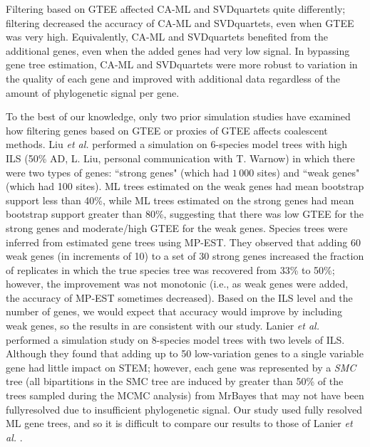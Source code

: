 Filtering based on GTEE affected CA-ML and SVDquartets quite differently; filtering decreased the accuracy of CA-ML and SVDquartets, even when GTEE was very high. 
Equivalently, CA-ML and SVDquartets benefited from the additional genes, even when the added genes had very low signal. 
In bypassing gene tree estimation, CA-ML and SVDquartets were more robust to variation in the quality of each gene and improved with additional data regardless of the amount of phylogenetic signal per gene.

To the best of our knowledge, only two prior simulation studies \cite{liu2015estimating, lanier2014how} have examined how filtering genes based on GTEE or proxies of GTEE affects coalescent methods.
Liu {\em et al.} \cite{liu2015estimating} performed a simulation on 6-species model trees with high ILS (50\% AD, L. Liu, personal communication with T. Warnow) in which there were two types of genes: ``strong genes" (which had $1\,000$ sites) and ``weak genes" (which had 100 sites). 
ML trees estimated on the weak genes had mean bootstrap support less than 40\%, while ML trees estimated on the strong genes had mean bootstrap support greater than 80\%, suggesting that there was low GTEE for the strong genes and moderate/high GTEE for the weak genes.
Species trees were inferred from estimated gene trees using MP-EST.
They \cite{liu2015estimating} observed that adding 60 weak genes (in increments of 10) to a set of 30 strong genes increased the fraction of replicates in which the true species tree was recovered from 33\% to 50\%; however, the improvement was not monotonic (i.e., as weak genes were added, the accuracy of MP-EST sometimes decreased).
Based on the ILS level and the number of genes, we would expect that accuracy would improve by including weak genes, so the results in \cite{liu2015estimating} are consistent with our study. 
Lanier {\em et al.} \cite{lanier2014how} performed a simulation study on 8-species model trees with two levels of ILS. Although they \cite{lanier2014how} found that adding up to 50 low-variation genes to a single variable gene had little impact on STEM; however, each gene was represented by a \textit{\gls{SMC}} tree (all bipartitions in the SMC tree are induced by greater than 50\% of the trees sampled during the MCMC analysis) from MrBayes \cite{ronquist2003mrbayes} that may not have been \gls{fullyresolved} due to insufficient phylogenetic signal.
Our study used fully resolved ML gene trees, and so it is difficult to compare our results to those of Lanier {\em et al.} \cite{lanier2014how}.

